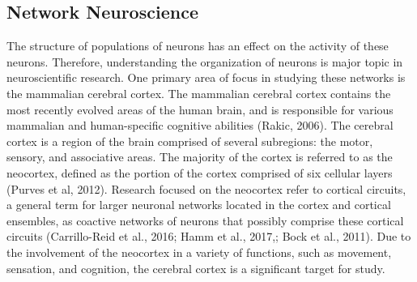 \documentclass[11pt,titlepage]{article}
\begin{document}


\subsection{Network Neuroscience}
The structure of populations of neurons has an effect on the activity of these neurons. Therefore, understanding the organization of neurons is major topic in neuroscientific research. One primary area of focus in studying these networks is the mammalian cerebral cortex. The mammalian cerebral cortex contains the most recently evolved areas of the human brain, and is responsible for various mammalian and human-specific cognitive abilities (Rakic, 2006). The cerebral cortex is a region of the brain comprised of several subregions: the motor, sensory, and associative areas. The majority of the cortex is referred to as the neocortex, defined as the portion of the cortex comprised of six cellular layers (Purves et al, 2012). %
Research focused on the neocortex refer to cortical circuits, a general term for larger neuronal networks located in the cortex and cortical ensembles, as coactive networks of neurons that possibly comprise these cortical circuits (Carrillo-Reid et al., 2016; Hamm et al., 2017,; Bock et al., 2011).  Due to the involvement of the neocortex in a variety of functions, such as movement, sensation, and cognition, the cerebral cortex is a significant target for study.\par
\end{document}

